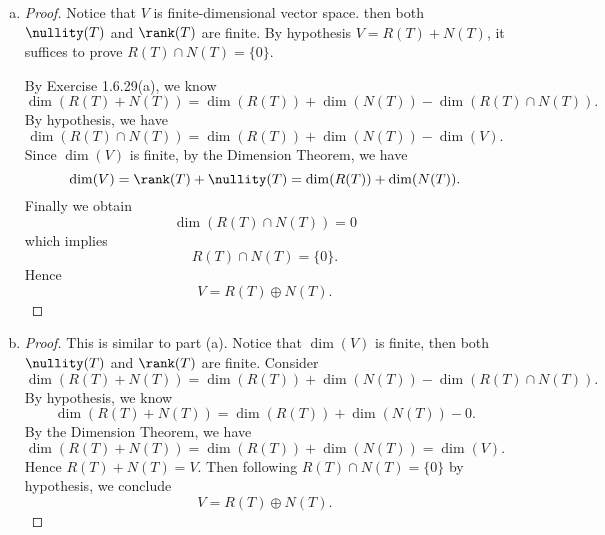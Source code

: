 
\begin{Exercise}
	\begin{enumerate}[(a)]
		\item
		\begin{proof}
			Notice that $V$ is finite-dimensional vector space. then both $\nullity(T)$ and $\rank(T)$ are finite. By hypothesis $V=R(T)+N(T)$, it suffices to prove $R(T)\cap N(T) = \{0\}$.
			
			By Exercise 1.6.29(a), we know 
			$$
			\dim(R(T)+N(T)) = \dim(R(T))+\dim(N(T))-\dim(R(T)\cap N(T)).
			$$
			By hypothesis, we have
			$$
			\dim(R(T)\cap N(T)) = \dim(R(T))+\dim(N(T))-\dim(V).
			$$
			Since $\dim(V)$ is finite, by the Dimension Theorem, we have
			$$
			\dim(V) = \rank(T)+ \nullity(T) = \dim(R(T))+\dim(N(T)).
			$$
			Finally we obtain
			$$
			\dim(R(T)\cap N(T)) = 0
			$$
			which implies
			$$
			R(T)\cap N(T) = \{0\}.
			$$
			Hence
			$$
			V = R(T)\oplus N(T).
			$$
		\end{proof}
		
		\item
		\begin{proof}
			This is similar to part (a). Notice that $\dim(V)$ is finite, then both $\nullity(T)$ and $\rank(T)$ are finite. Consider
			$$
			\dim(R(T)+N(T)) = \dim(R(T))+\dim(N(T))-\dim(R(T)\cap N(T)).
			$$
			By hypothesis, we know
			$$
			\dim(R(T)+N(T)) = \dim(R(T))+\dim(N(T))-0.
			$$
			By the Dimension Theorem, we have
			$$
			\dim(R(T)+N(T)) = \dim(R(T))+\dim(N(T)) = \dim(V).
			$$
			Hence $R(T)+N(T) = V$. Then following $R(T)\cap N(T) = \{0\}$ by hypothesis, we conclude
			$$
			V = R(T)\oplus N(T).
			$$
		\end{proof}
	\end{enumerate}
\end{Exercise}